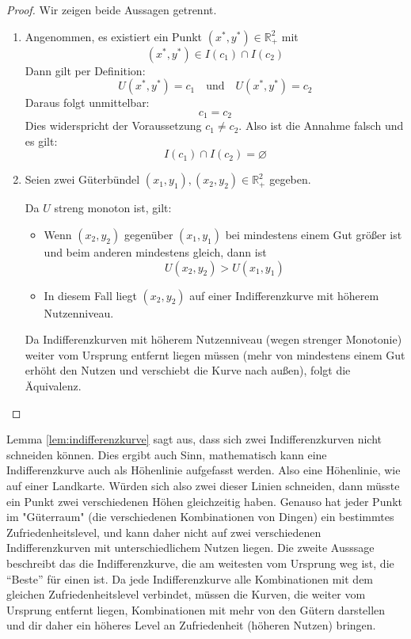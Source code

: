 \begin{proof}
	Wir zeigen beide Aussagen getrennt.

	\begin{enumerate}
		\item
		      Angenommen, es existiert ein Punkt $(x^*, y^*) \in \mathbb{R}_{+}^2$ mit
		      \[
			      (x^*, y^*) \in I(c_1) \cap I(c_2)
		      \]
		      Dann gilt per Definition:
		      \[
			      U(x^*, y^*) = c_1 \quad \text{und} \quad U(x^*, y^*) = c_2
		      \]
		      Daraus folgt unmittelbar:
		      \[
			      c_1 = c_2
		      \]
		      Dies widerspricht der Voraussetzung $c_1 \neq c_2$.
		      Also ist die Annahme falsch und es gilt:
		      \[
			      I(c_1) \cap I(c_2) = \varnothing
		      \]

		\item	Seien zwei Güterbündel $(x_1, y_1), (x_2, y_2) \in \mathbb{R}_{+}^2$ gegeben.

		      Da $U$ streng monoton ist, gilt:
		      \begin{itemize}
			      \item Wenn $(x_2, y_2)$ gegenüber $(x_1, y_1)$ bei mindestens einem Gut größer ist und beim anderen mindestens gleich, dann ist
			            \[
				            U(x_2, y_2) > U(x_1, y_1)
			            \]
			      \item In diesem Fall liegt $(x_2, y_2)$ auf einer Indifferenzkurve mit höherem Nutzenniveau.
		      \end{itemize}
		      Da Indifferenzkurven mit höherem Nutzenniveau (wegen strenger Monotonie) weiter vom Ursprung entfernt liegen müssen (mehr von mindestens einem Gut erhöht den Nutzen und verschiebt die Kurve nach außen), folgt die Äquivalenz.

	\end{enumerate}
\end{proof}

Lemma \ref{lem:indifferenzkurve} sagt aus, dass sich zwei Indifferenzkurven nicht schneiden können. Dies ergibt auch Sinn, mathematisch kann eine Indifferenzkurve auch als Höhenlinie aufgefasst werden.
Also eine Höhenlinie, wie auf einer Landkarte. Würden sich also zwei dieser Linien schneiden, dann müsste ein Punkt zwei verschiedenen Höhen gleichzeitig haben.
Genauso hat jeder Punkt im "Güterraum" (die verschiedenen Kombinationen von Dingen) ein bestimmtes Zufriedenheitslevel, und kann daher nicht auf zwei verschiedenen Indifferenzkurven mit unterschiedlichem Nutzen liegen.
Die zweite Ausssage beschreibt das die Indifferenzkurve, die am weitesten vom Ursprung weg ist, die \enquote{Beste} für einen ist.
Da jede Indifferenzkurve alle Kombinationen mit dem gleichen Zufriedenheitslevel verbindet, müssen die Kurven, die weiter vom Ursprung entfernt liegen, Kombinationen mit mehr von den Gütern darstellen und dir daher ein höheres Level an Zufriedenheit (höheren Nutzen) bringen.

